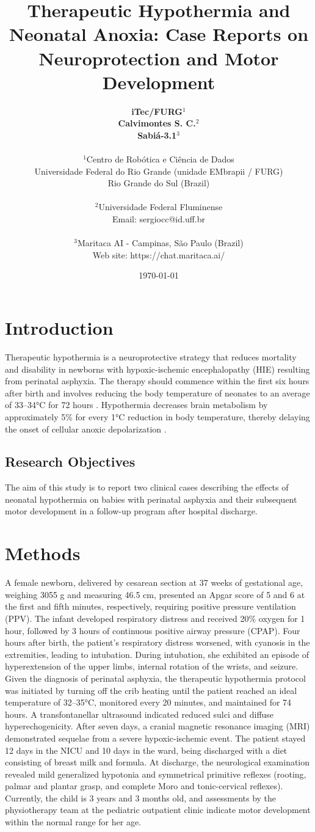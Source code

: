 \documentclass[11pt,a4paper]{article}
\title{\textbf{Therapeutic Hypothermia and Neonatal Anoxia: Case Reports on Neuroprotection and Motor Development}}
\author{
	\textbf{iTec/FURG}$^{1}$ \\
	\textbf{Calvimontes S. C.}$^{2}$ \\
	\textbf{Sabiá-3.1}$^{3}$ \\
	\\
	\small $^{1}$Centro de Robótica e Ciência de Dados \\
	\small Universidade Federal do Rio Grande (unidade EMbrapii / FURG) \\
	\small Rio Grande do Sul (Brazil) \\
	\\
	\small $^{2}$Universidade Federal Fluminense \\
	\small Email: sergiocc@id.uff.br \\
	\\
	\small $^{3}$Maritaca AI - Campinas, São Paulo (Brazil) \\
	\small Web site: https://chat.maritaca.ai/
}
\date{\today}
\begin{document}
	
	\maketitle
	
	\newpage
	
	\section{Introduction}
	Therapeutic hypothermia is a neuroprotective strategy that reduces mortality and disability in newborns with hypoxic-ischemic encephalopathy (HIE) resulting from perinatal asphyxia. The therapy should commence within the first six hours after birth and involves reducing the body temperature of neonates to an average of 33–34°C for 72 hours \cite{Azzopardi2014, Laptook2017, Silveira2015}. Hypothermia decreases brain metabolism by approximately 5\% for every 1°C reduction in body temperature, thereby delaying the onset of cellular anoxic depolarization \cite{Silveira2015}.
		
	\subsection{Research Objectives}
	The aim of this study is to report two clinical cases describing the effects of neonatal hypothermia on babies with perinatal asphyxia and their subsequent motor development in a follow-up program after hospital discharge.
	
	\section{Methods}
	A female newborn, delivered by cesarean section at 37 weeks of gestational age, weighing 3055 g and measuring 46.5 cm, presented an Apgar score of 5 and 6 at the first and fifth minutes, respectively, requiring positive pressure ventilation (PPV). The infant developed respiratory distress and received 20\% oxygen for 1 hour, followed by 3 hours of continuous positive airway pressure (CPAP). Four hours after birth, the patient's respiratory distress worsened, with cyanosis in the extremities, leading to intubation. During intubation, she exhibited an episode of hyperextension of the upper limbs, internal rotation of the wrists, and seizure. Given the diagnosis of perinatal asphyxia, the therapeutic hypothermia protocol was initiated by turning off the crib heating until the patient reached an ideal temperature of 32–35°C, monitored every 20 minutes, and maintained for 74 hours. A transfontanellar ultrasound indicated reduced sulci and diffuse hyperechogenicity. After seven days, a cranial magnetic resonance imaging (MRI) demonstrated sequelae from a severe hypoxic-ischemic event. The patient stayed 12 days in the NICU and 10 days in the ward, being discharged with a diet consisting of breast milk and formula. At discharge, the neurological examination revealed mild generalized hypotonia and symmetrical primitive reflexes (rooting, palmar and plantar grasp, and complete Moro and tonic-cervical reflexes). Currently, the child is 3 years and 3 months old, and assessments by the physiotherapy team at the pediatric outpatient clinic indicate motor development within the normal range for her age.
	
\end{document}
